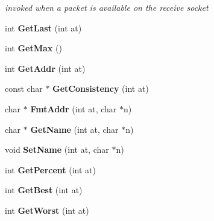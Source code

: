 \begin{CompactItemize}
\begin{CompactList}\small\item\em invoked when a packet is available on the receive socket \item\end{CompactList}\item 
\hypertarget{classWinMTRNet_35ef2e019fefa5340dfc9e3ed06a971c}{
int \textbf{GetLast} (int at)}
\label{classWinMTRNet_35ef2e019fefa5340dfc9e3ed06a971c}

\item 
\hypertarget{classWinMTRNet_9ce911108cef6d446f03dac073b1943d}{
int \textbf{GetMax} ()}
\label{classWinMTRNet_9ce911108cef6d446f03dac073b1943d}

\item 
\hypertarget{classWinMTRNet_cb49abde3ba55593637f645ef3f533e1}{
int \textbf{GetAddr} (int at)}
\label{classWinMTRNet_cb49abde3ba55593637f645ef3f533e1}

\item 
\hypertarget{classWinMTRNet_c8ea3d1edd080552a09f889f56ec97e9}{
const char $\ast$ \textbf{GetConsistency} (int at)}
\label{classWinMTRNet_c8ea3d1edd080552a09f889f56ec97e9}

\item 
\hypertarget{classWinMTRNet_e1023a4eaa5e77dd1edaf93995f40a14}{
char $\ast$ \textbf{FmtAddr} (int at, char $\ast$n)}
\label{classWinMTRNet_e1023a4eaa5e77dd1edaf93995f40a14}

\item 
\hypertarget{classWinMTRNet_f8623a681e57a00b21d33933b84c58b1}{
char $\ast$ \textbf{GetName} (int at, char $\ast$n)}
\label{classWinMTRNet_f8623a681e57a00b21d33933b84c58b1}

\item 
\hypertarget{classWinMTRNet_d637e2e67d0250620c1476fabda81eb0}{
void \textbf{SetName} (int at, char $\ast$n)}
\label{classWinMTRNet_d637e2e67d0250620c1476fabda81eb0}

\item 
\hypertarget{classWinMTRNet_05722cf863d2ae5f535daad300d78c41}{
int \textbf{GetPercent} (int at)}
\label{classWinMTRNet_05722cf863d2ae5f535daad300d78c41}

\item 
\hypertarget{classWinMTRNet_eb3de00d68ad47df69bbe2789516c2e8}{
int \textbf{GetBest} (int at)}
\label{classWinMTRNet_eb3de00d68ad47df69bbe2789516c2e8}

\item 
\hypertarget{classWinMTRNet_dbb2bb5b5cd882d6a0aed7ce7c2e13b7}{
int \textbf{GetWorst} (int at)}
\label{classWinMTRNet_dbb2bb5b5cd882d6a0aed7ce7c2e13b7}


\end{CompactItemize}
